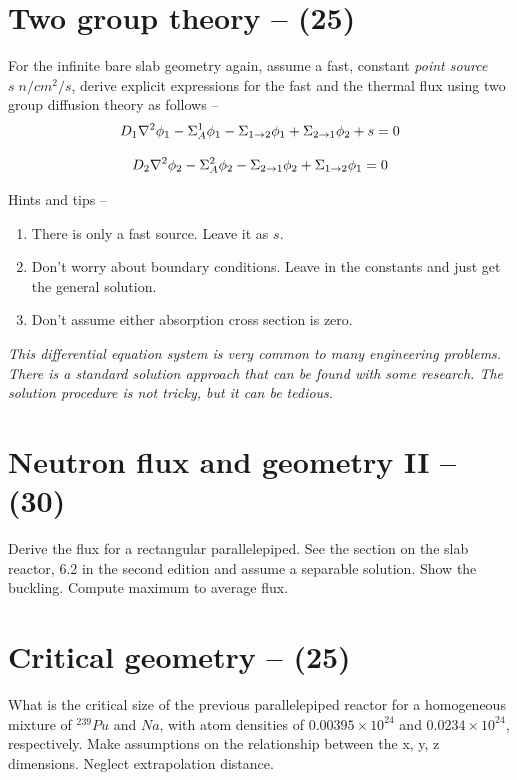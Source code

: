 \documentclass[11pt,a4paper]{article}
\begin{document}
\newpage

\section{Two group theory -- (25)}
For the infinite bare slab geometry again, assume a fast, constant \textit{point source} $s \; n/cm^2/s$, derive explicit expressions for the fast and the thermal flux using two group diffusion theory as follows --
\begin{equation} \label{eq-fast-flux}
    \large D_1\nabla^2{\phi_1}-\Sigma_A^1\phi_1-\Sigma_{1 \rightarrow 2}\phi_1+\Sigma_{2 \rightarrow 1}\phi_2+s=0
\end{equation}

\begin{equation} \label{eq-thermal-flux}
    \large D_2\nabla^2{\phi_2}-\Sigma_A^2\phi_2-\Sigma_{2 \rightarrow 1}\phi_2+\Sigma_{1 \rightarrow 2}\phi_1=0
\end{equation}

\noindent Hints and tips --
\begin{enumerate}
    \item There is only a fast source. Leave it as $s$.
    \item Don't worry about boundary conditions. Leave in the constants and just get the general solution.
    \item Don't assume either absorption cross section is zero.
\end{enumerate}


\textit{This differential equation system is very common to many engineering problems. There is a standard solution approach that can be found with some research. The solution procedure is not tricky, but it can be tedious.}





\newpage

\section{Neutron flux and geometry II -- (30)}
Derive the flux for a rectangular parallelepiped. See the section on the slab reactor, 6.2 in the second edition and assume a separable solution. Show the buckling. Compute maximum to average flux.





\newpage

\section{Critical geometry -- (25)}
What is the critical size of the previous parallelepiped reactor for a homogeneous mixture of $^{239}Pu$ and $Na$, with atom densities of $0.00395 \times 10^{24}$ and $0.0234 \times 10^{24}$, respectively. Make assumptions on the relationship between the x, y, z dimensions. Neglect extrapolation distance. 
\end{document}
